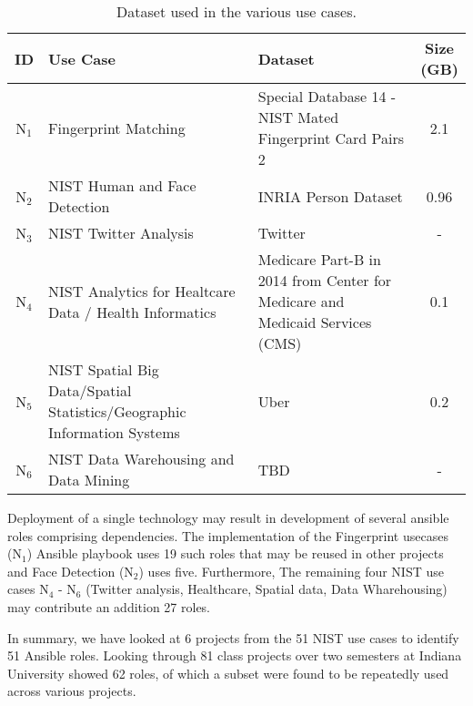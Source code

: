 \begin{table*}[htb]
  \caption{Dataset used in the various use cases.}
  \bigskip
  \label{T:usecase2}
  \begin{center}
    \begin{tabular}{|c|p{}|p{}|c|}

      \hline

      ID & Use Case & Dataset & \shortstack{Size\\(GB)} \tabularnewline \hline
      N$_1$ & Fingerprint Matching & Special Database 14 - NIST Mated Fingerprint Card Pairs 2 & 2.1 \tabularnewline \hline
      N$_2$ & NIST Human and Face Detection & INRIA Person Dataset & 0.96 \tabularnewline \hline
      N$_3$ & NIST Twitter Analysis & Twitter & - \tabularnewline \hline
      N$_4$ & NIST Analytics for Healtcare Data / Health Informatics & Medicare Part-B in 2014 from Center for Medicare and Medicaid Services (CMS) & 0.1 \tabularnewline \hline
      N$_5$ & NIST Spatial Big Data/Spatial Statistics/Geographic Information Systems & Uber & 0.2 \tabularnewline \hline
      N$_6$ & NIST Data Warehousing and Data Mining & TBD & - \tabularnewline \hline

    \end{tabular}
  \end{center}
\end{table*}


Deployment of a single technology may result in development of several ansible roles comprising dependencies.
The implementation of the Fingerprint usecases (N$_1$) Ansible playbook uses 19 such roles that may be reused in other projects and Face Detection (N$_2$) uses five.
Furthermore, The remaining four NIST use cases N$_4$ - N$_6$ (Twitter analysis, Healthcare, Spatial data, Data Wharehousing) may contribute an addition 27 roles.

In summary, we have looked at 6 projects from the 51 NIST use cases to identify 51 Ansible roles.
Looking through 81 class projects over two semesters at Indiana University showed 62 roles, of which a subset were found to be repeatedly used across various projects.





